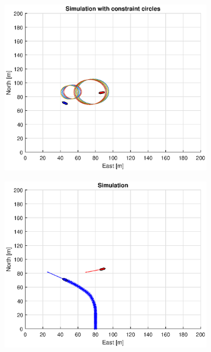 \begin{figure}[ht]\ContinuedFloat
    \begin{subfigure}[b]{0.49\textwidth}
        \centering
        \includegraphics[width=\textwidth]{Images/Figures/sving_GW/Simple1_f1_Frame4}
    \end{subfigure}
    \hfill
    \begin{subfigure}[b]{0.499\textwidth}
        \centering
        \includegraphics[width=\textwidth]{Images/Figures/sving_GW/Simple1_f600_Frame4}

\end{subfigure}
\end{figure}
